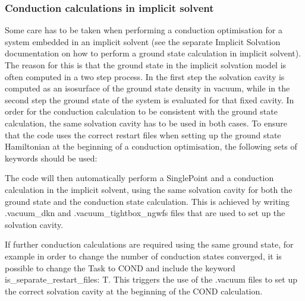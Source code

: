 \documentclass[letterpaper,10pt,english]{sphinxmanual}
\begin{document}
\subsubsection{Conduction calculations in implicit solvent}
\label{\detokenize{conduction:conduction-calculations-in-implicit-solvent}}
\begin{DUlineblock}{0em}
\item[] Some care has to be taken when performing a conduction optimisation
for a system embedded in an implicit solvent (see the separate
Implicit Solvation documentation on how to perform a ground state
calculation in implicit solvent). The reason for this is that the
ground state in the implicit solvation model is often computed in a
two step process. In the first step the solvation cavity is computed
as an isosurface of the ground state density in vacuum, while in the
second step the ground state of the system is evaluated for that fixed
cavity. In order for the conduction calculation to be consistent with
the ground state calculation, the same solvation cavity has to be used
in both cases. To ensure that the code uses the correct restart files
when setting up the ground state Hamiltonian at the beginning of a
conduction optimisation, the following sets of keywords should be
used:
\end{DUlineblock}

\begin{DUlineblock}{0em}
\item[] 
\item[] 
\item[] 
\item[] 
\end{DUlineblock}

\begin{DUlineblock}{0em}
\item[] The code will then automatically perform a SinglePoint and a
conduction calculation in the implicit solvent, using the same
solvation cavity for both the ground state and the conduction state
calculation. This is achieved by writing .vacuum\_dkn and
.vacuum\_tightbox\_ngwfs files that are used to set up the solvation
cavity.
\end{DUlineblock}

If further conduction calculations are required using the same ground
state, for example in order to change the number of conduction states
converged, it is possible to change the Task to COND and include the
keyword is\_separate\_restart\_files: T. This triggers the use of the
.vacuum files to set up the correct solvation cavity at the beginning of
the COND calculation.
\end{document}
